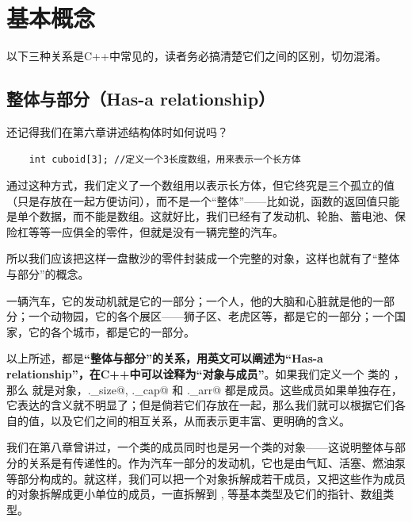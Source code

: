 \section{基本概念}
以下三种关系是C++中常见的，读者务必搞清楚它们之间的区别，切勿混淆。\par
\subsection*{整体与部分（Has-a relationship）}
还记得我们在第六章讲述结构体时如何说吗？
\begin{lstlisting}
    int cuboid[3]; //定义一个3长度数组，用来表示一个长方体
\end{lstlisting}
通过这种方式，我们定义了一个数组用以表示长方体，但它终究是三个孤立的值（只是存放在一起方便访问），而不是一个``整体''——比如说，函数的返回值只能是单个数据，而不能是数组。这就好比，我们已经有了发动机、轮胎、蓄电池、保险杠等等一应俱全的零件，但就是没有一辆完整的汽车。\par
所以我们应该把这样一盘散沙的零件封装成一个完整的对象，这样也就有了``整体与部分''的概念。\par
一辆汽车，它的发动机就是它的一部分；一个人，他的大脑和心脏就是他的一部分；一个动物园，它的各个展区——狮子区、老虎区等，都是它的一部分；一个国家，它的各个城市，都是它的一部分。\par
以上所述，都是\textbf{``整体与部分''的关系，用英文可以阐述为``Has-a relationship''，在C++中可以诠释为``对象与成员''}。如果我们定义一个 \lstinline@valarri@ 类的 \lstinline@a@，那么 \lstinline@a@ 就是对象，\lstinline@a._size@, \lstinline@a._cap@ 和 \lstinline@a._arr@ 都是成员。这些成员如果单独存在，它表达的含义就不明显了；但是倘若它们存放在一起，那么我们就可以根据它们各自的值，以及它们之间的相互关系，从而表示更丰富、更明确的含义。\par
我们在第八章曾讲过，一个类的成员同时也是另一个类的对象——这说明整体与部分的关系是有传递性的。作为汽车一部分的发动机，它也是由气缸、活塞、燃油泵等部分构成的。就这样，我们可以把一个对象拆解成若干成员，又把这些作为成员的对象拆解成更小单位的成员，一直拆解到 \lstinline@int@, \lstinline@double@ 等基本类型及它们的指针、数组类型。\par
